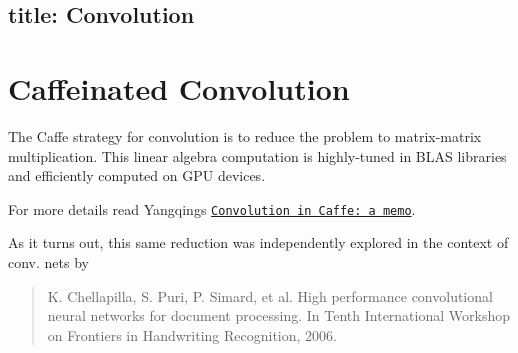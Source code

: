 

 \subsection*{title\+: Convolution }

\section*{Caffeinated Convolution}

The Caffe strategy for convolution is to reduce the problem to matrix-\/matrix multiplication. This linear algebra computation is highly-\/tuned in B\+L\+AS libraries and efficiently computed on G\+PU devices.

For more details read Yangqing\textquotesingle{}s \href{https://github.com/Yangqing/caffe/wiki/Convolution-in-Caffe:-a-memo}{\tt Convolution in Caffe\+: a memo}.

As it turns out, this same reduction was independently explored in the context of conv. nets by

\begin{quote}
K. Chellapilla, S. Puri, P. Simard, et al. High performance convolutional neural networks for document processing. In Tenth International Workshop on Frontiers in Handwriting Recognition, 2006.\end{quote}
